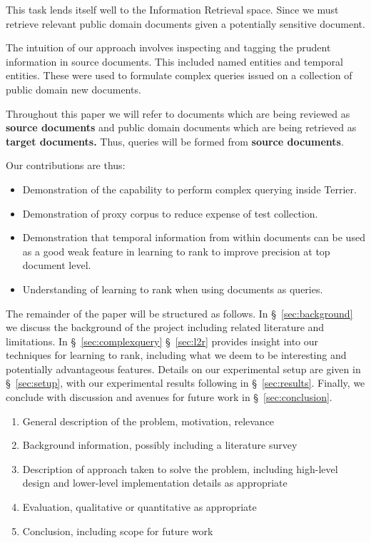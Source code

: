 \documentclass{mpaper}
\begin{document}
This task lends itself well to the Information Retrieval space. Since we must retrieve relevant public domain documents given a potentially sensitive document.

The intuition of our approach involves inspecting and tagging the prudent information in source documents. This included named entities and temporal entities. These were used to formulate complex queries issued on a collection of public domain new documents.

Throughout this paper we will refer to documents which are being reviewed as \textbf{source documents} and public domain documents which are being retrieved as \textbf{target documents.} Thus, queries will be formed from \textbf{source documents}.


Our contributions are thus:
\begin{itemize}
\item Demonstration of the capability to perform complex querying inside Terrier.
\item Demonstration of proxy corpus to reduce expense of test collection.
\item Demonstration that temporal information from within documents can be used as a good weak feature in learning to rank to improve precision at top document level.
\item Understanding of learning to rank when using documents as queries.
\end{itemize}

The remainder of the paper will be structured as follows.
In \S~\ref{sec:background} we discuss the background of the project including related literature and limitations.
In \S~\ref{sec:complexquery}
\S~\ref{sec:l2r} provides insight into our techniques for learning to rank, including what we deem to be interesting and potentially advantageous features.
Details on our experimental setup are given in \S~\ref{sec:setup}, with our experimental results following in \S~\ref{sec:results}.
Finally, we conclude with discussion and avenues for future work in \S~\ref{sec:conclusion}.

\begin{enumerate}
\item General description of the problem, motivation, relevance
\item Background information, possibly including a literature survey
\item Description of approach taken to solve the problem, including
  high-level design and lower-level implementation details as appropriate
\item Evaluation, qualitative or quantitative as appropriate
\item Conclusion, including scope for future work
\end{enumerate}
\end{document}
